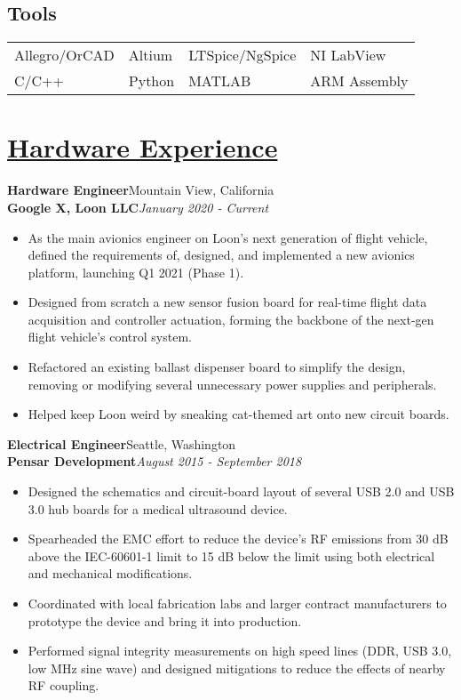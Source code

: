 \documentclass[a4paper, 11pt]{article}
\begin{document}
  \subsection{\textbf{Tools}}
  \begin{tabular}{l l l l}
    Allegro/OrCAD & Altium & LTSpice/NgSpice & NI LabView\\
    C/C++ & Python & MATLAB & ARM Assembly
  \end{tabular}

\section{\underline{Hardware Experience}}
  \textbf{Hardware Engineer}\hfill Mountain View, California\\
  \textbf{Google X, Loon LLC}\hfill \emph{January 2020 - Current}\smallskip
  \begin{itemize}[nosep]
    \item As the main avionics engineer on Loon's next generation of flight vehicle, defined the requirements of, designed, and implemented a new avionics platform, launching Q1 2021 (Phase 1).
    \item Designed from scratch a new sensor fusion board for real-time flight data acquisition and controller actuation, forming the backbone of the next-gen flight vehicle's control system.
    \item Refactored an existing ballast dispenser board to simplify the design, removing or modifying several unnecessary power supplies and peripherals.
    \item Helped keep Loon weird by sneaking cat-themed art onto new circuit boards.
  \end{itemize}
  \medskip
  
  \textbf{Electrical Engineer}\hfill Seattle, Washington\\
  \textbf{Pensar Development}\hfill \emph{August 2015 - September 2018}\smallskip
  \begin{itemize}[nosep]
    \item Designed the schematics and circuit-board layout of several USB 2.0 and USB 3.0 hub boards for a medical ultrasound device.
    \item Spearheaded the EMC effort to reduce the device's RF emissions from 30 dB above the IEC-60601-1 limit to 15 dB below the limit using both electrical and mechanical modifications.
    \item Coordinated with local fabrication labs and larger contract manufacturers to prototype the device and bring it into production.
    \item Performed signal integrity measurements on high speed lines (DDR, USB 3.0, low MHz sine wave) and designed mitigations to reduce the effects of nearby RF coupling.
  \end{itemize}
  \medskip
  
\end{document}
